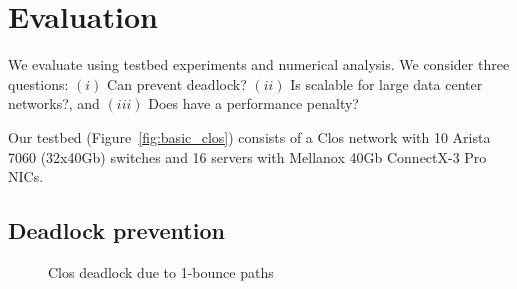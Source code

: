 \section{Evaluation}\label{sec:eval}

We evaluate \sysname{} using testbed experiments and numerical analysis.  We
consider three questions: $(i)$ Can \sysname{} prevent deadlock?  $(ii)$ Is
\sysname{} scalable for large data center networks?, and $(iii)$ Does \sysname{}
have a performance penalty?


 Our testbed (Figure~\ref{fig:basic_clos}) consists of a Clos
network with 10 Arista 7060 (32x40Gb) switches and 16 servers with Mellanox 40Gb
ConnectX-3 Pro NICs.  

\subsection{Deadlock prevention}\label{subsec:exp_validation}

\begin{figure}[t]
	\centering
	
	\vspace{-1em}
	\caption{Clos deadlock due to 1-bounce paths}\label{fig:exp_validation_nonloop}
	\vspace{-0.15in}
\end{figure}

